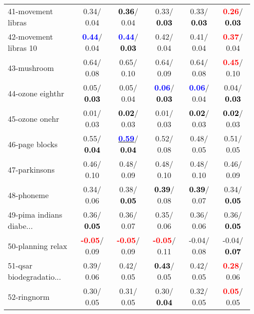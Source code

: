\begin{table}[h]
\begin{center}
\begin{tabular}{lc|c|c|c|c}
41-movement libras &   0.34/  0.04 & \textcolor{black}{\textbf{  0.36}}/  0.04 &   0.33/\textcolor{black}{\textbf{  0.03}} &   0.33/\textcolor{black}{\textbf{  0.03}} & \textcolor{red}{\textbf{  0.26}}/\textcolor{black}{\textbf{  0.03}} \\
42-movement libras 10 & \textcolor{blue}{\textbf{  0.44}}/  0.04 & \textcolor{blue}{\textbf{  0.44}}/\textcolor{black}{\textbf{  0.03}} &   0.42/  0.04 &   0.41/  0.04 & \textcolor{red}{\textbf{  0.37}}/  0.04 \\
43-mushroom &   0.64/  0.08 &   0.65/  0.10 &   0.64/  0.09 &   0.64/  0.08 & \textcolor{red}{\textbf{  0.45}}/  0.10 \\
44-ozone eighthr &   0.05/\textcolor{black}{\textbf{  0.03}} &   0.05/  0.04 & \textcolor{blue}{\textbf{  0.06}}/\textcolor{black}{\textbf{  0.03}} & \textcolor{blue}{\textbf{  0.06}}/  0.04 &   0.04/\textcolor{black}{\textbf{  0.03}} \\
45-ozone onehr &   0.01/  0.03 & \textcolor{black}{\textbf{  0.02}}/  0.03 &   0.01/  0.03 & \textcolor{black}{\textbf{  0.02}}/  0.03 & \textcolor{black}{\textbf{  0.02}}/  0.03 \\
46-page blocks &   0.55/\textcolor{black}{\textbf{  0.04}} & \underline{\textcolor{blue}{\textbf{  0.59}}}/\textcolor{black}{\textbf{  0.04}} &   0.52/  0.08 &   0.48/  0.05 &   0.51/  0.05 \\ \hline
47-parkinsons &   0.46/  0.10 &   0.48/  0.09 &   0.48/  0.10 &   0.48/  0.10 &   0.46/  0.09 \\
48-phoneme &   0.34/  0.06 &   0.38/\textcolor{black}{\textbf{  0.05}} & \textcolor{black}{\textbf{  0.39}}/  0.08 & \textcolor{black}{\textbf{  0.39}}/  0.07 &   0.34/\textcolor{black}{\textbf{  0.05}} \\
49-pima indians diabe... &   0.36/\textcolor{black}{\textbf{  0.05}} &   0.36/  0.07 &   0.35/  0.06 &   0.36/  0.06 &   0.36/\textcolor{black}{\textbf{  0.05}} \\
50-planning relax & \textcolor{red}{\textbf{ -0.05}}/  0.09 & \textcolor{red}{\textbf{ -0.05}}/  0.09 & \textcolor{red}{\textbf{ -0.05}}/  0.11 &  -0.04/  0.08 &  -0.04/\textcolor{black}{\textbf{  0.07}} \\
51-qsar biodegradatio... &   0.39/  0.06 &   0.42/  0.05 & \textcolor{black}{\textbf{  0.43}}/  0.05 &   0.42/  0.05 & \textcolor{red}{\textbf{  0.28}}/  0.06 \\
52-ringnorm &   0.30/  0.05 &   0.31/  0.05 &   0.30/\textcolor{black}{\textbf{  0.04}} &   0.32/  0.05 & \textcolor{red}{\textbf{  0.05}}/  0.05 \\

\end{tabular}
\end{center}
\end{table}
